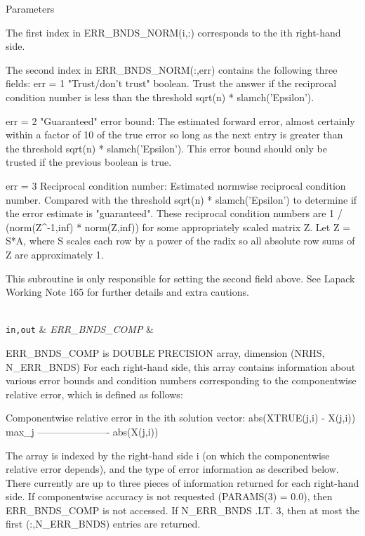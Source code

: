 \begin{DoxyParams}[1]{Parameters}
\begin{DoxyVerb}
     The first index in ERR_BNDS_NORM(i,:) corresponds to the ith
     right-hand side.

     The second index in ERR_BNDS_NORM(:,err) contains the following
     three fields:
     err = 1 "Trust/don't trust" boolean. Trust the answer if the
              reciprocal condition number is less than the threshold
              sqrt(n) * slamch('Epsilon').

     err = 2 "Guaranteed" error bound: The estimated forward error,
              almost certainly within a factor of 10 of the true error
              so long as the next entry is greater than the threshold
              sqrt(n) * slamch('Epsilon'). This error bound should only
              be trusted if the previous boolean is true.

     err = 3  Reciprocal condition number: Estimated normwise
              reciprocal condition number.  Compared with the threshold
              sqrt(n) * slamch('Epsilon') to determine if the error
              estimate is "guaranteed". These reciprocal condition
              numbers are 1 / (norm(Z^{-1},inf) * norm(Z,inf)) for some
              appropriately scaled matrix Z.
              Let Z = S*A, where S scales each row by a power of the
              radix so all absolute row sums of Z are approximately 1.

     This subroutine is only responsible for setting the second field
     above.
     See Lapack Working Note 165 for further details and extra
     cautions.\end{DoxyVerb}
\\
\hline
\mbox{\tt in,out}  & {\em E\+R\+R\+\_\+\+B\+N\+D\+S\+\_\+\+C\+O\+M\+P} & \begin{DoxyVerb}          ERR_BNDS_COMP is DOUBLE PRECISION array, dimension
                    (NRHS, N_ERR_BNDS)
     For each right-hand side, this array contains information about
     various error bounds and condition numbers corresponding to the
     componentwise relative error, which is defined as follows:

     Componentwise relative error in the ith solution vector:
                    abs(XTRUE(j,i) - X(j,i))
             max_j ----------------------
                         abs(X(j,i))

     The array is indexed by the right-hand side i (on which the
     componentwise relative error depends), and the type of error
     information as described below. There currently are up to three
     pieces of information returned for each right-hand side. If
     componentwise accuracy is not requested (PARAMS(3) = 0.0), then
     ERR_BNDS_COMP is not accessed.  If N_ERR_BNDS .LT. 3, then at most
     the first (:,N_ERR_BNDS) entries are returned.


\end{DoxyVerb}
\end{DoxyParams}
